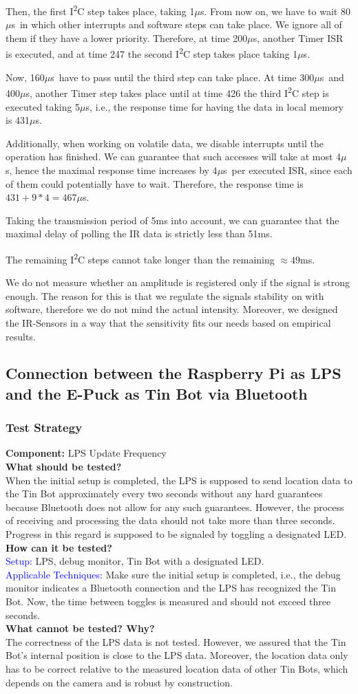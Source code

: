 \documentclass[a4paper,parskip,headheight=38pt]{scrartcl} %
\newcommand{\teststrat}[5]{
    \subsubsection{Test Strategy}
	\textbf{Component:} #1 \\
	\noindent\textbf{What should be tested?} \\
    \noindent #2 \\
	\noindent\textbf{How can it be tested?} \\
    \noindent\textcolor{blue}{Setup:} #3 \\
    \noindent\textcolor{blue}{Applicable Techniques:} #4 \\
	\noindent\textbf{What cannot be tested? Why?} \\
    \noindent #5
}
\newcommand{\ie}{i.e.}
\newcommand{\mics}{$\mu$s}
\begin{document}
{    Then, the first I\textsuperscript{2}C step takes place, taking 1\mics. From now on, we have to
    wait 80\mics\  in which other interrupts and software steps can take place.
    We ignore all of them if they have a lower priority. Therefore, at time
    200\mics, another Timer ISR is executed, and at time 247 the second I\textsuperscript{2}C step
    takes place taking 1\mics. 

    Now, 160\mics\  have to pass until the third step can take place. At
    time 300\mics\  and 400\mics, another Timer step takes place until at time
    426 the third I\textsuperscript{2}C step is executed taking 5\mics, \ie, the response time for
    having the data in local memory is 431\mics.

    Additionally, when working on volatile data, we disable interrupts until the
    operation has finished. We can guarantee that such accesses will take at
    most 4\mics, hence the maximal response time increases by 4\mics\  per
    executed ISR, since each of them could potentially have to wait. Therefore,
    the response time is $431 + 9 * 4 = 467$\mics.

    Taking the transmission period of 5ms into account, we can guarantee that
    the maximal delay of polling the IR data is strictly less than 51ms.

    The remaining I\textsuperscript{2}C steps cannot take longer than the remaining $\approx
    49$ms.
}{
   We do not measure whether an amplitude is registered only if the signal is
   strong enough. The reason for this is that we regulate the signals stability
   on with software, therefore we do not mind the actual intensity. Moreover, we
   designed the IR-Sensors in a way that the sensitivity fits our needs based on
   empirical results.
}

\subsection{Connection between the Raspberry Pi as LPS and the E-Puck as Tin Bot
via Bluetooth}

\teststrat{LPS Update Frequency}{
    When the initial setup is completed, the LPS is supposed to send location
    data
    to the Tin Bot approximately every two seconds without any hard guarantees
    because Bluetooth does not allow for any such guarantees.
    However, the process of receiving and processing the data should not take
    more than three seconds. Progress in this regard is supposed to be signaled
    by toggling a designated LED.
}{
    LPS, debug monitor, Tin Bot with a designated LED.
}{
    Make sure the initial setup is completed, \ie, the debug monitor indicates a
    Bluetooth connection and the LPS has recognized the Tin Bot. Now, the time
    between toggles is measured and should not exceed three seconds.
}{
    The correctness of the LPS data is not tested. However, we assured that the
    Tin Bot's internal position is close to the LPS data. Moreover, the location
    data only has to be correct relative to the measured location data of other
    Tin
    Bots, which depends on the camera and is robust by construction.
}
\end{document}
